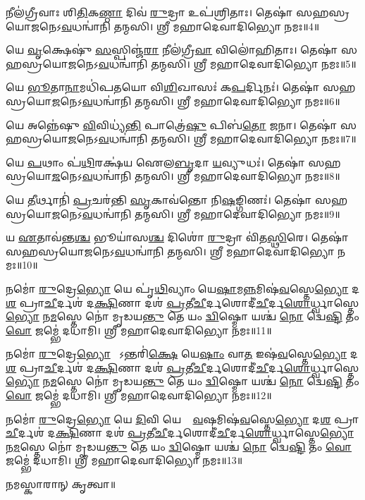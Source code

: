 𑌨𑍀𑌲॑𑌗𑍍𑌰𑍀𑌵𑌾𑌃 𑌶𑌿\ul{𑌤𑌿}𑌕\ul{𑌣𑍍𑌠𑌾} 𑌦𑌿𑌵॑ \ul{𑌰𑍁}𑌦𑍍𑌰𑌾 𑌉𑌪॑𑌶𑍍𑌰𑌿𑌤𑌾𑌃। 𑌤𑍇𑌷𑌾॑ 𑌸𑌹𑌸𑍍𑌰𑌯𑍋\ul{𑌜}𑌨𑍇\-𑌽\ul{𑌵}𑌧𑌨𑍍𑌵𑌾॑𑌨𑌿 𑌤𑌨𑍍𑌮𑌸𑌿। 𑌶𑍍𑌰𑍀 𑌮𑌹𑌾𑌦𑍇𑌵𑌾𑌦𑌿𑌭𑍍𑌯𑍋 𑌨𑌮𑌃॥4॥

𑌯𑍇 \ul{𑌵𑍃}𑌕𑍍𑌷𑍇𑌷𑍁॑ \ul{𑌸}𑌸𑍍𑌪𑌿𑌞𑍍𑌜॑\ul{𑌰𑌾} 𑌨𑍀𑌲॑𑌗𑍍𑌰𑍀\ul{𑌵𑌾} 𑌵𑌿𑌲𑍋॑𑌹𑌿𑌤𑌾𑌃। 𑌤𑍇𑌷𑌾॑ 𑌸𑌹𑌸𑍍𑌰𑌯𑍋\ul{𑌜}𑌨𑍇\-𑌽\ul{𑌵}𑌧𑌨𑍍𑌵𑌾॑𑌨𑌿 𑌤𑌨𑍍𑌮𑌸𑌿। 𑌶𑍍𑌰𑍀 𑌮𑌹𑌾𑌦𑍇𑌵𑌾𑌦𑌿𑌭𑍍𑌯𑍋 𑌨𑌮𑌃॥5॥

𑌯𑍇 \ul{𑌭𑍂}𑌤𑌾\ul{𑌨𑌾}𑌮𑌧𑌿॑𑌪𑌤𑌯𑍋 𑌵𑌿\ul{𑌶𑌿}𑌖𑌾𑌸𑌃॑ 𑌕\ul{𑌪}𑌰𑍍𑌦𑌿𑌨𑌃॑। 𑌤𑍇𑌷𑌾॑ 𑌸𑌹𑌸𑍍𑌰𑌯𑍋\ul{𑌜}𑌨𑍇\-𑌽\ul{𑌵}𑌧𑌨𑍍𑌵𑌾॑𑌨𑌿 𑌤𑌨𑍍𑌮𑌸𑌿। 𑌶𑍍𑌰𑍀 𑌮𑌹𑌾𑌦𑍇𑌵𑌾𑌦𑌿𑌭𑍍𑌯𑍋 𑌨𑌮𑌃॥6॥

𑌯𑍇 𑌅𑌨𑍍𑌨𑍇॑𑌷𑍁 \ul{𑌵𑌿}𑌵𑌿𑌧𑍍𑌯॑\ul{𑌨𑍍𑌤𑌿} 𑌪𑌾𑌤𑍍𑌰𑍇॑\ul{𑌷𑍁} 𑌪𑌿𑌬॑\ul{𑌤𑍋} 𑌜𑌨𑌾\sn। 𑌤𑍇𑌷𑌾॑ 𑌸𑌹𑌸𑍍𑌰𑌯𑍋\ul{𑌜}𑌨𑍇\-𑌽\ul{𑌵}𑌧𑌨𑍍𑌵𑌾॑𑌨𑌿 𑌤𑌨𑍍𑌮𑌸𑌿। 𑌶𑍍𑌰𑍀 𑌮𑌹𑌾𑌦𑍇𑌵𑌾𑌦𑌿𑌭𑍍𑌯𑍋 𑌨𑌮𑌃॥7॥

𑌯𑍇 \ul{𑌪}𑌥𑌾𑌂 𑌪॑\ul{𑌥𑌿}𑌰𑌕𑍍𑌷॑𑌯 𑌐𑌲\ul{𑌬𑍃}𑌦𑌾 \ul{𑌯}𑌵𑍍𑌯𑍁𑌧𑌃॑। 𑌤𑍇𑌷𑌾॑ 𑌸𑌹𑌸𑍍𑌰𑌯𑍋\ul{𑌜}𑌨𑍇\-𑌽\ul{𑌵}𑌧𑌨𑍍𑌵𑌾॑𑌨𑌿 𑌤𑌨𑍍𑌮𑌸𑌿। 𑌶𑍍𑌰𑍀 𑌮𑌹𑌾𑌦𑍇𑌵𑌾𑌦𑌿𑌭𑍍𑌯𑍋 𑌨𑌮𑌃॥8॥

𑌯𑍇 \ul{𑌤𑍀}𑌰𑍍𑌥𑌾𑌨𑌿॑ \ul{𑌪𑍍𑌰}𑌚𑌰॑𑌨𑍍𑌤𑌿 \ul{𑌸𑍃}𑌕𑌾𑌵॑𑌨𑍍𑌤𑍋 𑌨𑌿\ul{𑌷}𑌙𑍍𑌗𑌿𑌣𑌃॑। 𑌤𑍇𑌷𑌾॑ 𑌸𑌹𑌸𑍍𑌰𑌯𑍋\ul{𑌜}𑌨𑍇\-𑌽\ul{𑌵}𑌧𑌨𑍍𑌵𑌾॑𑌨𑌿 𑌤𑌨𑍍𑌮𑌸𑌿। 𑌶𑍍𑌰𑍀 𑌮𑌹𑌾𑌦𑍇𑌵𑌾𑌦𑌿𑌭𑍍𑌯𑍋 𑌨𑌮𑌃॥9॥

𑌯 \ul{𑌏}𑌤𑌾𑌵॑𑌨𑍍𑌤\ul{𑌶𑍍𑌚} 𑌭𑍂𑌯𑌾॑𑌸\ul{𑌶𑍍𑌚} 𑌦𑌿𑌶𑍋॑ \ul{𑌰𑍁}𑌦𑍍𑌰𑌾 𑌵𑌿॑𑌤\ul{𑌸𑍍𑌥𑌿}𑌰𑍇। 𑌤𑍇𑌷𑌾॑ 𑌸𑌹𑌸𑍍𑌰𑌯𑍋\ul{𑌜}𑌨𑍇\-𑌽\ul{𑌵}𑌧𑌨𑍍𑌵𑌾॑𑌨𑌿 𑌤𑌨𑍍𑌮𑌸𑌿। 𑌶𑍍𑌰𑍀 𑌮𑌹𑌾𑌦𑍇𑌵𑌾𑌦𑌿𑌭𑍍𑌯𑍋 𑌨𑌮𑌃॥10॥

𑌨𑌮𑍋॑ \ul{𑌰𑍁}𑌦𑍍𑌰𑍇\ul{𑌭𑍍𑌯𑍋} 𑌯𑍇 𑌪𑍃॑\ul{𑌥𑌿}𑌵𑍍𑌯𑌾𑌂 𑌯𑍇\ul{𑌷𑌾}𑌮\ul{𑌨𑍍𑌨}𑌮𑌿𑌷॑\ul{𑌵}𑌸𑍍𑌤𑍇\ul{𑌭𑍍𑌯𑍋} 𑌦\ul{𑌶} 𑌪𑍍𑌰𑌾\ul{𑌚𑍀}𑌰𑍍𑌦𑌶॑ 𑌦\ul{𑌕𑍍𑌷𑌿}𑌣𑌾 𑌦𑌶॑ \ul{𑌪𑍍𑌰}𑌤𑍀\ul{𑌚𑍀}𑌰𑍍𑌦𑌶𑍋\-𑌦𑍀॑\ul{𑌚𑍀}𑌰𑍍𑌦\ul{𑌶𑍋}𑌰𑍍𑌧𑍍𑌵𑌾𑌸𑍍𑌤𑍇\ul{𑌭𑍍𑌯𑍋} 𑌨\ul{𑌮}𑌸𑍍𑌤𑍇 𑌨𑍋॑ 𑌮𑍃𑌡𑌯\ul{𑌨𑍍𑌤𑍁} 𑌤𑍇 𑌯𑌂 \ul{𑌦𑍍𑌵𑌿}𑌷𑍍𑌮𑍋 𑌯𑌶𑍍𑌚॑ \ul{𑌨𑍋} 𑌦𑍍𑌵𑍇\ul{𑌷𑍍𑌟𑌿} 𑌤𑌂 \ul{𑌵𑍋} 𑌜𑌮𑍍𑌭𑍇॑ 𑌦𑌧𑌾𑌮𑌿। 𑌶𑍍𑌰𑍀 𑌮𑌹𑌾𑌦𑍇𑌵𑌾𑌦𑌿𑌭𑍍𑌯𑍋 𑌨𑌮𑌃॥11॥ 

𑌨𑌮𑍋॑ \ul{𑌰𑍁}𑌦𑍍𑌰𑍇\ul{𑌭𑍍𑌯𑍋} 𑌯𑍇᳚𑌽𑌨𑍍𑌤𑌰𑌿॑\ul{𑌕𑍍𑌷𑍇} 𑌯𑍇\ul{𑌷𑌾𑌂} 𑌵𑌾\ul{𑌤} 𑌇𑌷॑\ul{𑌵}𑌸𑍍𑌤𑍇\ul{𑌭𑍍𑌯𑍋} 𑌦\ul{𑌶} 𑌪𑍍𑌰𑌾\ul{𑌚𑍀}𑌰𑍍𑌦𑌶॑ 𑌦\ul{𑌕𑍍𑌷𑌿}𑌣𑌾 𑌦𑌶॑ \ul{𑌪𑍍𑌰}𑌤𑍀\ul{𑌚𑍀}𑌰𑍍𑌦𑌶𑍋\-𑌦𑍀॑\ul{𑌚𑍀}𑌰𑍍𑌦\ul{𑌶𑍋}𑌰𑍍𑌧𑍍𑌵𑌾𑌸𑍍𑌤𑍇\ul{𑌭𑍍𑌯𑍋} 𑌨\ul{𑌮}𑌸𑍍𑌤𑍇 𑌨𑍋॑ 𑌮𑍃𑌡𑌯\ul{𑌨𑍍𑌤𑍁} 𑌤𑍇 𑌯𑌂 \ul{𑌦𑍍𑌵𑌿}𑌷𑍍𑌮𑍋 𑌯𑌶𑍍𑌚॑ \ul{𑌨𑍋} 𑌦𑍍𑌵𑍇\ul{𑌷𑍍𑌟𑌿} 𑌤𑌂 \ul{𑌵𑍋} 𑌜𑌮𑍍𑌭𑍇॑ 𑌦𑌧𑌾𑌮𑌿। 𑌶𑍍𑌰𑍀 𑌮𑌹𑌾𑌦𑍇𑌵𑌾𑌦𑌿𑌭𑍍𑌯𑍋 𑌨𑌮𑌃॥12॥ 

𑌨𑌮𑍋॑ \ul{𑌰𑍁}𑌦𑍍𑌰𑍇\ul{𑌭𑍍𑌯𑍋} 𑌯𑍇 \ul{𑌦𑌿}𑌵𑌿 𑌯𑍇𑌷𑌾𑌂᳚ \ul{𑌵}\ar 𑌷𑌮𑌿𑌷॑\ul{𑌵}𑌸𑍍𑌤𑍇\ul{𑌭𑍍𑌯𑍋} 𑌦\ul{𑌶} 𑌪𑍍𑌰𑌾\ul{𑌚𑍀}𑌰𑍍𑌦𑌶॑ 𑌦\ul{𑌕𑍍𑌷𑌿}𑌣𑌾 𑌦𑌶॑ \ul{𑌪𑍍𑌰}𑌤𑍀\ul{𑌚𑍀}𑌰𑍍𑌦𑌶𑍋\-𑌦𑍀॑\ul{𑌚𑍀}𑌰𑍍𑌦\ul{𑌶𑍋}𑌰𑍍𑌧𑍍𑌵𑌾𑌸𑍍𑌤𑍇\ul{𑌭𑍍𑌯𑍋} 𑌨\ul{𑌮}𑌸𑍍𑌤𑍇 𑌨𑍋॑ 𑌮𑍃𑌡𑌯\ul{𑌨𑍍𑌤𑍁} 𑌤𑍇 𑌯𑌂 \ul{𑌦𑍍𑌵𑌿}𑌷𑍍𑌮𑍋 𑌯𑌶𑍍𑌚॑ \ul{𑌨𑍋} 𑌦𑍍𑌵𑍇\ul{𑌷𑍍𑌟𑌿} 𑌤𑌂 \ul{𑌵𑍋} 𑌜𑌮𑍍𑌭𑍇॑ 𑌦𑌧𑌾𑌮𑌿। 𑌶𑍍𑌰𑍀 𑌮𑌹𑌾𑌦𑍇𑌵𑌾𑌦𑌿𑌭𑍍𑌯𑍋 𑌨𑌮𑌃॥13॥ 

𑌨𑌮𑌸𑍍𑌕𑌾𑌰𑌾𑌨𑍍 𑌕𑍃𑌤𑍍𑌵𑌾॥

{\small \closesection}


